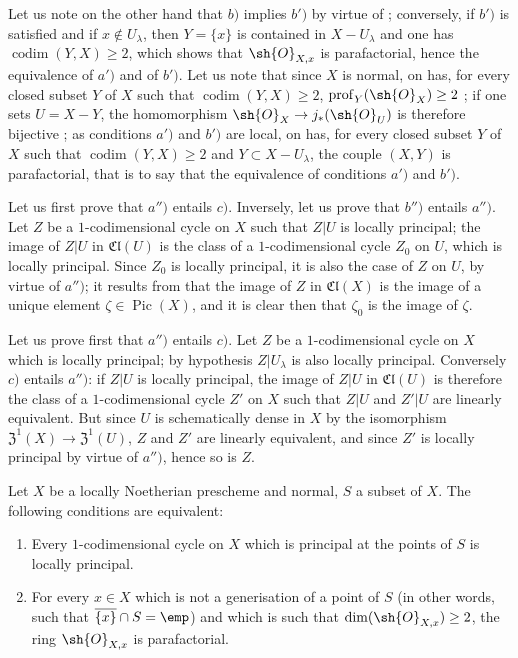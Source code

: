 Let us note on the other hand that $b)$ implies $b')$ by virtue of ; conversely, if $b')$ is satisfied and if $x\notin U_\lambda$, then $Y=\{x\}$ is contained in $X-U_\lambda$ and one has $\operatorname{codim}(Y,X)\geq 2$, which shows that $\sh{O}_{X,x}$ is parafactorial, hence the equivalence of $a')$ and of $b')$.
Let us note that since $X$ is normal, on has, for every closed subset $Y$ of $X$ such that $\operatorname{codim}(Y,X)\geq 2$, $\operatorname{prof}_Y(\sh{O}_X)\geq 2$ ; if one sets $U=X-Y$, the homomorphism $\sh{O}_X\to j_*(\sh{O}_U)$ is therefore bijective ; as conditions $a')$ and $b')$ are local, on has, for every closed subset $Y$ of $X$ such that $\operatorname{codim}(Y,X)\geq 2$ and $Y\subset X-U_\lambda$, the couple $(X,Y)$ is parafactorial, that is to say that the equivalence of conditions $a')$ and $b')$.

Let us first prove that $a'')$ entails $c)$.
Inversely, let us prove that $b'')$ entails $a'')$.
Let $Z$ be a $1$-codimensional cycle on $X$ such that $Z|U$ is locally principal; the image of $Z|U$ in $\mathfrak{Cl}(U)$  is the class of a $1$-codimensional cycle $Z_0$ on $U$, which is locally principal.
Since $Z_0$ is locally principal, it is also the case of $Z$ on $U$, by virtue of $a'')$; it results from  that the image of $Z$ in $\mathfrak{Cl}(X)$ is the image of a unique element $\zeta\in\operatorname{Pic}(X)$, and it is clear then that $\zeta_0$ is the image of $\zeta$.

Let us prove first that $a'')$ entails $c)$.
Let $Z$ be a $1$-codimensional cycle on $X$ which is locally principal; by hypothesis $Z|U_\lambda$ is also locally principal.
Conversely $c)$ entails $a'')$: if $Z|U$ is locally principal, the image of $Z|U$ in $\mathfrak{Cl}(U)$ is therefore the class of a $1$-codimensional cycle $Z'$ on $X$ such that $Z|U$ and $Z'|U$ are linearly equivalent.
But since $U$ is schematically dense in $X$ by the isomorphism $\mathfrak{Z}^1(X)\to\mathfrak{Z}^1(U)$, $Z$ and $Z'$ are linearly equivalent, and since $Z'$ is locally principal by virtue of $a'')$, hence so is $Z$.

\begin{corollary}[21.13.15]
\label{IV.21.13.15}
Let $X$ be a locally Noetherian prescheme and normal, $S$ a subset of $X$.
The following conditions are equivalent:
\begin{enumerate}
  \item[a)] Every $1$-codimensional cycle on $X$ which is principal at the points of $S$ is locally principal.
  \item[b)] For every $x\in X$ which is not a generisation of a point of $S$ (in other words, such that $\overline{\{x\}}\cap S=\emp$) and which is such that $\dim(\sh{O}_{X,x})\geq 2$, the ring $\sh{O}_{X,x}$ is parafactorial.
\end{enumerate}
\end{corollary}

